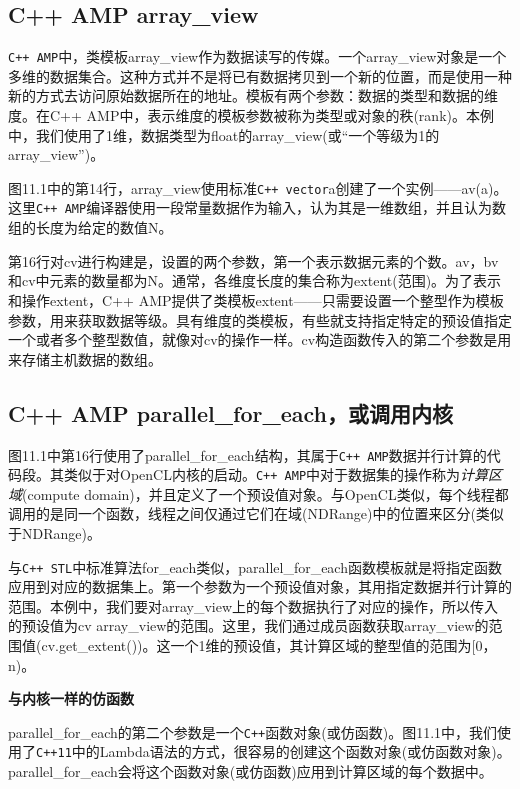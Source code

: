 \subsection{C++ AMP array\_view}

\texttt{C++ AMP}中，类模板array\_\allowbreak{}view作为数据读写的传媒。一个array\_\allowbreak{}view对象是一个多维的数据集合。这种方式并不是将已有数据拷贝到一个新的位置，而是使用一种新的方式去访问原始数据所在的地址。模板有两个参数：数据的类型和数据的维度。在C++ AMP中，表示维度的模板参数被称为类型或对象的秩(rank)。本例中，我们使用了1维，数据类型为float的array\_\allowbreak{}view(或“一个等级为1的array\_\allowbreak{}view”)。

图11.1中的第14行，array\_\allowbreak{}view使用标准\texttt{C++ vector}a创建了一个实例——av(a)。这里\texttt{C++ AMP}编译器使用一段常量数据作为输入，认为其是一维数组，并且认为数组的长度为给定的数值N。

第16行对cv进行构建是，设置的两个参数，第一个表示数据元素的个数。av，bv和cv中元素的数量都为N。通常，各维度长度的集合称为extent(范围)。为了表示和操作extent，C++ AMP提供了类模板extent——只需要设置一个整型作为模板参数，用来获取数据等级。具有维度的类模板，有些就支持指定特定的预设值指定一个或者多个整型数值，就像对cv的操作一样。cv构造函数传入的第二个参数是用来存储主机数据的数组。

\subsection{C++ AMP parallel\_for\_each，或调用内核}

图11.1中第16行使用了parallel\_\allowbreak{}for\_\allowbreak{}each结构，其属于\texttt{C++ AMP}数据并行计算的代码段。其类似于对OpenCL内核的启动。\texttt{C++ AMP}中对于数据集的操作称为\emph{计算区域}(compute domain)，并且定义了一个预设值对象。与OpenCL类似，每个线程都调用的是同一个函数，线程之间仅通过它们在域(NDRange)中的位置来区分(类似于NDRange)。

与\texttt{C++ STL}中标准算法for\_\allowbreak{}each类似，parallel\_\allowbreak{}for\_\allowbreak{}each函数模板就是将指定函数应用到对应的数据集上。第一个参数为一个预设值对象，其用指定数据并行计算的范围。本例中，我们要对array\_\allowbreak{}view上的每个数据执行了对应的操作，所以传入的预设值为cv array\_\allowbreak{}view的范围。这里，我们通过成员函数获取array\_\allowbreak{}view的范围值(cv.get\_\allowbreak{}extent())。这一个1维的预设值，其计算区域的整型值的范围为[0，n)。

\textbf{与内核一样的仿函数}

parallel\_\allowbreak{}for\_\allowbreak{}each的第二个参数是一个\texttt{C++}函数对象(或仿函数)。图11.1中，我们使用了\texttt{C++11}中的Lambda语法的方式，很容易的创建这个函数对象(或仿函数对象)。parallel\_\allowbreak{}for\_\allowbreak{}each会将这个函数对象(或仿函数)应用到计算区域的每个数据中。

